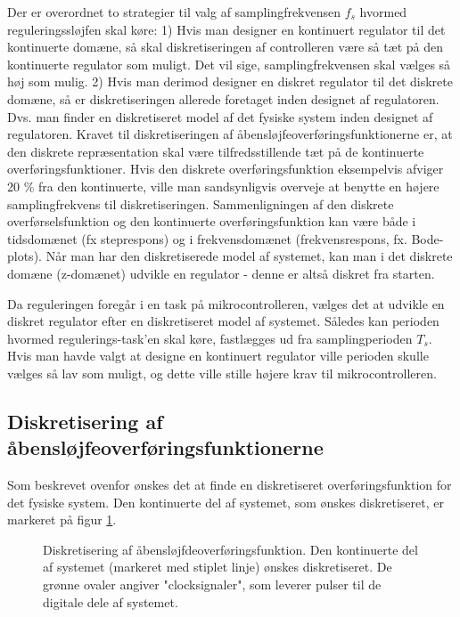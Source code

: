 Der er overordnet to strategier til valg af samplingfrekvensen \(f_s\) hvormed
reguleringssløjfen skal køre:
1) Hvis man designer en kontinuert regulator til det kontinuerte domæne, så
skal diskretiseringen af controlleren være så tæt på den kontinuerte regulator som muligt.
Det vil sige, samplingfrekvensen skal vælges så høj som mulig.
2) Hvis man derimod designer en diskret regulator til det diskrete domæne,
så er diskretiseringen allerede foretaget inden designet af regulatoren.
Dvs. man finder en diskretiseret model af det fysiske system inden designet af regulatoren.
Kravet til diskretiseringen af åbensløjfeoverføringsfunktionerne er, at den diskrete repræsentation
skal være tilfredsstillende tæt på de kontinuerte overføringsfunktioner.
Hvis den diskrete overføringsfunktion eksempelvis afviger 20 \% fra den kontinuerte, ville man
sandsynligvis overveje at benytte en højere samplingfrekvens til diskretiseringen.
Sammenligningen af den diskrete overførselsfunktion og den kontinuerte overføringsfunktion
kan være både i tidsdomænet (fx steprespons) og i frekvensdomænet (frekvensrespons, fx. Bode-plots).
Når man har den diskretiserede model af systemet, kan man i det diskrete domæne (z-domænet)
udvikle en regulator - denne er altså diskret fra starten.

Da reguleringen foregår i en task på mikrocontrolleren, vælges det
at udvikle en diskret regulator efter en diskretiseret model af systemet.
Således kan perioden hvormed regulerings-task'en skal køre, fastlægges ud fra
samplingperioden \(T_s\). Hvis man havde valgt at designe en kontinuert regulator
ville perioden skulle vælges så lav som muligt, og dette ville stille højere krav
til mikrocontrolleren.

\subsection{Diskretisering af åbensløjfeoverføringsfunktionerne}
Som beskrevet ovenfor ønskes det at finde en diskretiseret overføringsfunktion
for det fysiske system. Den kontinuerte del af systemet, som ønskes diskretiseret,
er markeret på figur \ref{fig:digitalkontroller2}.
\begin{figure}[!th]
\centering
\begin{tikzpicture}[auto, node distance=2.6cm,>=latex']

\end{tikzpicture}
\caption[Diskretisering af åbensløjfeoverføringsfunktion]{Diskretisering af åbensløjfdeoverføringsfunktion.
	Den kontinuerte del af systemet (markeret med stiplet linje) ønskes diskretiseret.
	De grønne ovaler angiver "clocksignaler", som leverer pulser til de digitale dele af systemet.}
\label{fig:digitalkontroller2}
\end{figure}

